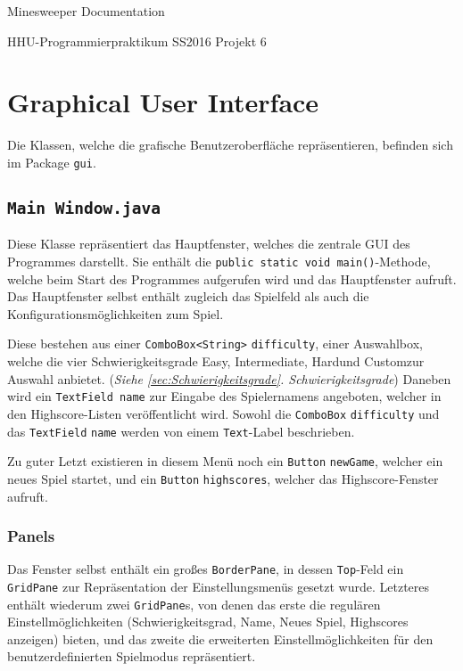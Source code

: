\documentclass[oneside,12pt]{scrartcl}
\newcommand*{\EnableHyphenationInTexttt}{\hyphenchar\font=45\relax}%
\newcommand{\class}[1]{\textcolor{Green4}{\bcode{#1}}}
\newcommand{\package}[1]{Package \npackage{#1}}
\newcommand{\npackage}[1]{\textcolor{Blue4}{\bcode{#1}}}
\newcommand{\method}[1]{\textcolor{Orange3}{\bcode{#1()}}}
\newcommand{\attribute}[1]{\textcolor{SkyBlue3}{\bcode{#1}}}
\newcommand{\classattribute}[2]{\class{#1} \attribute{#2}}
\newcommand{\bcode}[1]{\texttt{\EnableHyphenationInTexttt#1}}
\begin{document}
\setlength{\parindent}{0pt} %
\setlength{\parskip}{5pt}
\cofoot{}
\rofoot{\pagemark}

\begin{center}
\Huge{Minesweeper Documentation} \par
\Large{HHU-Programmierpraktikum SS2016 Projekt 6}
\end{center}

\tableofcontents

\section{Graphical User Interface}
Die Klassen, welche die grafische Benutzeroberfläche repräsentieren, befinden sich im \package{gui}.

\subsection{\class{Main Window.java}}
Diese Klasse repräsentiert das \glqq Hauptfenster\grqq, welches die zentrale GUI des Programmes darstellt. Sie enthält die \method{public static void main}-Methode, welche beim Start des Programmes aufgerufen wird und das Hauptfenster aufruft. Das Hauptfenster selbst enthält zugleich das Spielfeld als auch die Konfigurationsmöglichkeiten zum Spiel.

Diese bestehen aus einer \classattribute{ComboBox<String>}{difficulty}, einer Auswahlbox, welche die vier Schwierigkeitsgrade \glqq Easy\grqq, \glqq Intermediate\grqq, \glqq Hard\grqq und \glqq Custom\grqq zur Auswahl anbietet. (\textit{Siehe \ref{sec:Schwierigkeitsgrade}. Schwierigkeitsgrade}) Daneben wird ein \attribute{TextField name} zur Eingabe des Spielernamens angeboten, welcher in den Highscore-Listen veröffentlicht wird. Sowohl die \classattribute{ComboBox}{difficulty} und das \classattribute{TextField}{name} werden von einem \attribute{Text}-Label beschrieben.

Zu guter Letzt existieren in diesem Menü noch ein \classattribute{Button}{newGame}, welcher ein neues Spiel startet, und ein \classattribute{Button}{highscores}, welcher das Highscore-Fenster aufruft.

\subsubsection{Panels}
Das Fenster selbst enthält ein großes \class{BorderPane}, in dessen \attribute{Top}-Feld ein \class{GridPane} zur Repräsentation der Einstellungsmenüs gesetzt wurde. Letzteres enthält wiederum zwei \class{GridPane}s, von denen das erste die regulären Einstellmöglichkeiten (Schwierigkeitsgrad, Name, Neues Spiel, Highscores anzeigen) bieten, und das zweite die erweiterten Einstellmöglichkeiten für den benutzerdefinierten Spielmodus repräsentiert.
\end{document}
